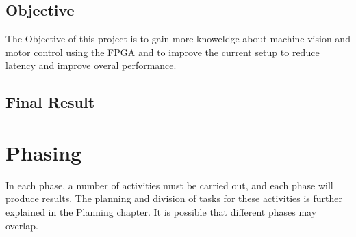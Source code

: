 \documentclass{article}
\begin{document}
\subsection{Objective}
The Objective of this project is to gain more knoweldge about machine vision and motor control using the FPGA 
and to improve the current setup to reduce latency and improve overal performance.
\subsection{Final Result}


\newpage
\section{Phasing}
In each phase, a number of activities must be carried out, and each phase will produce results.
The planning and division of tasks for these activities is further explained in the Planning chapter.
It is possible that different phases may overlap.

%
\end{document}
